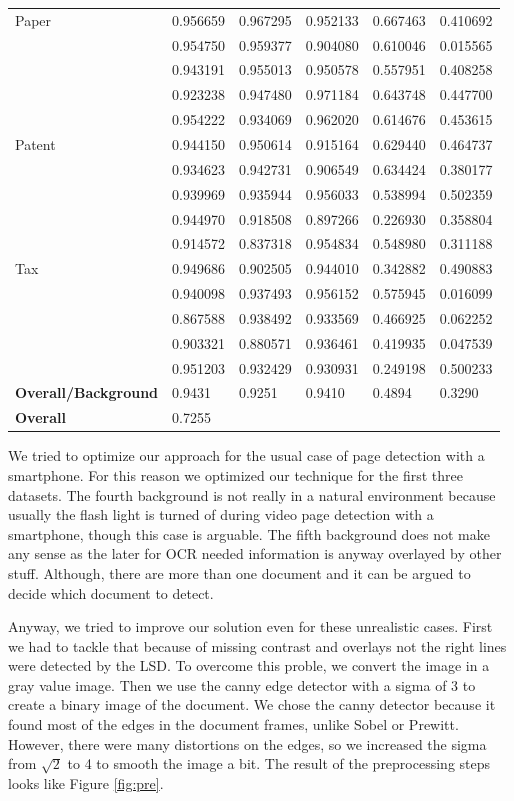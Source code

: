 \documentclass[english, paper=a4]{scrartcl}
\begin{document}
\begin{table}[]
\begin{tabular}{l | p{2cm}| p{2cm}| p{2cm}| p{2cm}| p{2cm} }
Paper & 0.956659 & 0.967295  &0.952133 &0.667463 &0.410692  \\   
		& 0.954750 & 0.959377  &0.904080 &0.610046 &0.015565  \\ 
		& 0.943191 & 0.955013  &0.950578 &0.557951 &0.408258  \\ 
		& 0.923238 & 0.947480  &0.971184 &0.643748 &0.447700  \\ 
		& 0.954222 & 0.934069  &0.962020 &0.614676 &0.453615  \\ \hline 	
Patent & 0.944150 & 0.950614  &0.915164 &0.629440 &0.464737  \\   
		& 0.934623 & 0.942731  &0.906549 &0.634424 &0.380177  \\ 
		& 0.939969 & 0.935944  &0.956033 &0.538994 &0.502359  \\ 
		& 0.944970 & 0.918508  &0.897266 &0.226930 &0.358804  \\ 
		& 0.914572 & 0.837318  &0.954834 &0.548980 &0.311188  \\ \hline 
Tax & 0.949686 & 0.902505  &0.944010 &0.342882 &0.490883  \\   
		& 0.940098 & 0.937493  &0.956152 &0.575945 &0.016099  \\ 
		& 0.867588 & 0.938492  &0.933569 &0.466925 &0.062252  \\ 
		& 0.903321 & 0.880571  &0.936461 &0.419935 &0.047539  \\ 
		& 0.951203 & 0.932429  &0.930931 &0.249198 &0.500233  \\ 	\hline \hline 
\textbf{Overall/Background} &0.9431 & 0.9251 & 0.9410 & 0.4894 &0.3290\\ \hline 
\textbf{Overall}&	 0.7255					            
\end{tabular}
\label{tab:results}
\end{table}

We tried to optimize our approach for the usual case of page detection
with a smartphone. For this reason we optimized our technique for the first three
datasets. 
The fourth background is not really in a natural environment because usually 
the flash light is turned of during video page detection with a smartphone,
though this case is arguable. 
The fifth background does not make any sense as the later for OCR needed
information is anyway overlayed by other stuff. Although, there are more
than one document and it can be argued to decide which document to detect.

Anyway, we tried to improve our solution even for these unrealistic cases.
First we had to tackle that because of missing contrast and overlays not the 
right lines were detected by the LSD.
To overcome this proble, we convert the image in a gray value image. Then we use the canny edge detector with a sigma of 3 to create a binary image of the document. We chose the canny detector because it found most of the edges in the document frames, unlike Sobel or Prewitt. However, there were many distortions on the edges, so we increased the sigma from $\sqrt{2}$ to 4 to smooth the image a bit. The result of the preprocessing steps looks like Figure \ref{fig:pre}.
\end{document}
